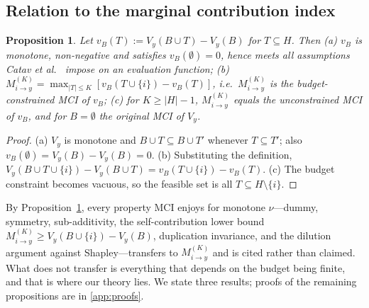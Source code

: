 \documentclass[preprint,12pt]{elsarticle}
\newtheorem{proposition}{Proposition}
\newcommand{\Vy}{V_{y}}
\newcommand{\Mik}{M^{(K)}_{i \to y}}
\begin{document}
\subsection{Relation to the marginal contribution index}
\begin{proposition}\label{prop:mci}
Let $v_B(T) := \Vy(B \cup T) - \Vy(B)$ for $T \subseteq H$. Then
\emph{(a)} $v_B$ is monotone, non-negative and satisfies $v_B(\emptyset)=0$, hence meets all
assumptions Catav et al.~\cite{catav2021mci} impose on an evaluation function;
\emph{(b)} $\Mik = \max_{|T|\le K}[v_B(T\cup\{i\}) - v_B(T)]$, i.e.\ $\Mik$ is the
\emph{budget-constrained} MCI of $v_B$;
\emph{(c)} for $K \ge |H|-1$, $\Mik$ equals the unconstrained MCI of $v_B$, and for
$B=\emptyset$ the original MCI of $\Vy$.
\end{proposition}
\begin{proof}
(a) $\Vy$ is monotone and $B\cup T \subseteq B\cup T'$ whenever $T\subseteq T'$; also
$v_B(\emptyset)=\Vy(B)-\Vy(B)=0$. (b) Substituting the definition,
$\Vy(B\cup T\cup\{i\})-\Vy(B\cup T)=v_B(T\cup\{i\})-v_B(T)$. (c) The budget constraint
becomes vacuous, so the feasible set is all $T\subseteq H\setminus\{i\}$.
\end{proof}

By Proposition~\ref{prop:mci}, every property MCI enjoys for monotone $\nu$---dummy, symmetry,
sub-additivity, the self-contribution lower bound $\Mik \ge \Vy(B\cup\{i\})-\Vy(B)$,
duplication invariance, and the dilution argument against Shapley---transfers to $\Mik$
and is cited rather than claimed. What does not transfer is everything that depends on the
budget being finite, and that is where our theory lies. We state three results; proofs of
the remaining propositions are in \ref{app:proofs}.
\end{document}
